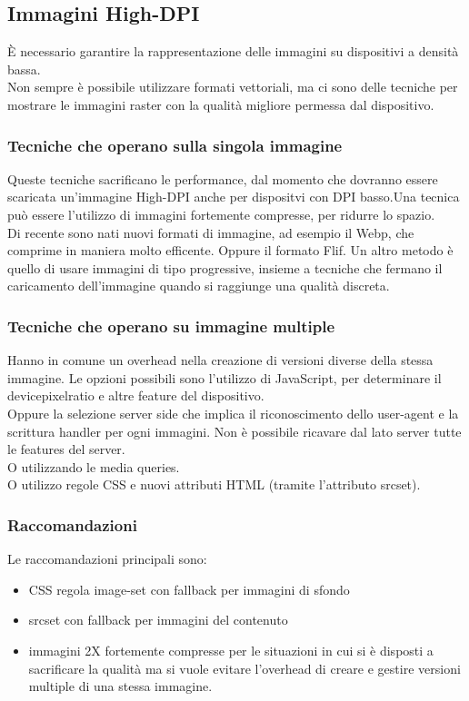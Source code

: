 \documentclass{article}
\begin{document}
\subsection{Immagini High-DPI}
È necessario garantire la rappresentazione delle immagini su dispositivi a densità bassa.\\
Non sempre è possibile utilizzare formati vettoriali, ma ci sono delle tecniche per mostrare le immagini raster con la qualità migliore permessa dal dispositivo.
\subsubsection{Tecniche che operano sulla singola immagine}
Queste tecniche sacrificano le performance, dal momento che dovranno essere scaricata un'immagine High-DPI anche per dispositvi con DPI basso.Una tecnica può essere l'utilizzo di immagini fortemente compresse, per ridurre lo spazio. \\
Di recente sono nati nuovi formati di immagine, ad esempio il Webp, che comprime in maniera molto efficente. Oppure il formato Flif. Un altro metodo è quello di usare immagini di tipo progressive, insieme a tecniche che fermano il caricamento dell'immagine quando si raggiunge una qualità discreta.
\subsubsection{Tecniche che operano su immagine multiple}
Hanno in comune un overhead nella creazione di versioni diverse della stessa immagine. Le opzioni possibili sono l'utilizzo di JavaScript, per determinare il devicepixelratio e altre feature del dispositivo.\\
Oppure la selezione server side che implica il riconoscimento dello user-agent e la scrittura handler per ogni immagini. Non è possibile ricavare dal lato server tutte le features del server.\\
O utilizzando le media queries.\\
O utilizzo regole CSS e nuovi attributi HTML (tramite l'attributo srcset).\\

\subsubsection{Raccomandazioni}
Le raccomandazioni principali sono: 
\begin{itemize}
	\item CSS regola image-set con fallback per immagini di sfondo
	\item srcset con fallback per immagini del contenuto
	\item immagini 2X fortemente compresse per le situazioni in cui si è disposti a sacrificare la qualità ma si vuole evitare l'overhead di creare e gestire versioni multiple di una stessa immagine.
\end{itemize}
\end{document}

